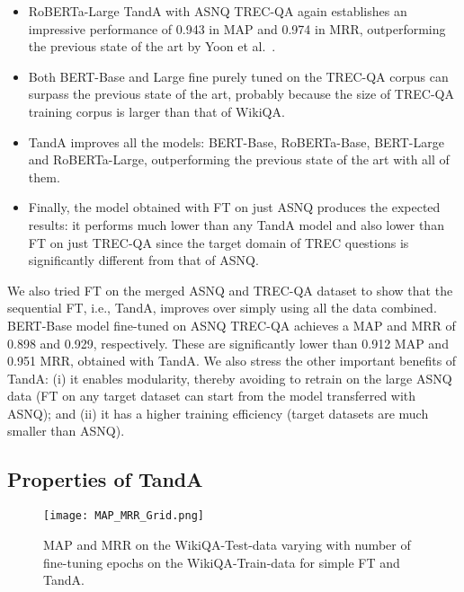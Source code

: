 \documentclass[letterpaper]{article} \usepackage{aaai20}  \usepackage{times}  \usepackage{helvet} \usepackage{courier}  \usepackage[hyphens]{url}  \usepackage{graphicx} \urlstyle{rm} \def\UrlFont{\rm}  \usepackage{graphicx}  \usepackage{todonotes}
\newcommand{\TANDA}{T{\sc and}A}
\begin{document}
\begin{itemize}
\item RoBERTa-Large {\TANDA} with ASNQ  TREC-QA again establishes an impressive performance of  0.943 in MAP and 0.974 in MRR, outperforming the previous state of the art by Yoon et al.~.
\item Both BERT-Base and Large fine purely tuned on the TREC-QA corpus can surpass the previous state of the art, probably because the size of TREC-QA training corpus is larger than that of WikiQA.
\item {\TANDA} improves all the models: BERT-Base, RoBERTa-Base, BERT-Large and RoBERTa-Large, outperforming the previous state of the art with all of them.
\item Finally, the model obtained with FT on just ASNQ produces the expected results: it performs much lower than any {\TANDA} model and also lower than FT on just \mbox{TREC-QA} since the target domain of TREC questions is significantly different from that of ASNQ. 
\end{itemize}

We also tried FT on the merged ASNQ and TREC-QA dataset to show that the sequential FT, i.e., {\TANDA}, improves over simply using all the data combined. BERT-Base model fine-tuned on ASNQ  TREC-QA achieves a MAP and MRR of 0.898 and 0.929, respectively. These are significantly lower than 0.912 MAP and 0.951 MRR, obtained with {\TANDA}. We also stress the other important benefits of {\TANDA}: (i) it enables modularity, thereby avoiding to retrain on the large ASNQ data (FT on any target dataset can start from the model transferred with ASNQ); and (ii) it has a higher training efficiency (target datasets are much smaller than ASNQ).

\subsection{Properties of {\TANDA}}

\begin{figure}[t]
    \texttt{[image: MAP\_MRR\_Grid.png]}
    \caption{MAP and MRR on the WikiQA-Test-data varying with number of fine-tuning epochs on the WikiQA-Train-data for simple FT and {\TANDA}.}
\label{fig:stability_WikiQA}
\vspace{-0.5em}
\end{figure}
\end{document}
